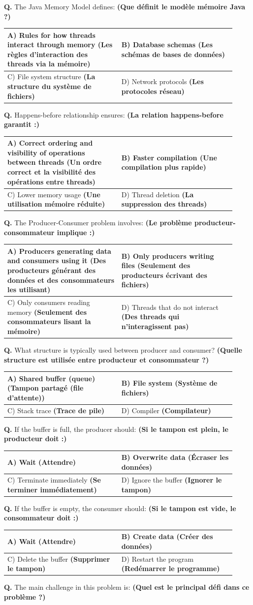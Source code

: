 \documentclass[11pt,a4paper]{article}
\newcounter{qnum}
\newcommand{\Q}{%
	\stepcounter{qnum}%
	\noindent\textbf{Q\theqnum. }%
}
\newcommand{\choices}[4]{%
	\setlength{\tabcolsep}{4pt}%
	\renewcommand{\arraystretch}{1.15}%
	\begin{tabular}{|p{0.46\linewidth}|p{0.46\linewidth}|}
		\hline
		A) #1 & B) #2 \\ \hline
		C) #3 & D) #4 \\ \hline
	\end{tabular}%
}
\begin{document}
\Q The Java Memory Model defines: \textbf{(Que définit le modèle mémoire Java ?) }

\choices
{Rules for how threads interact through memory \textbf{(Les règles d’interaction des threads via la mémoire)}}
{Database schemas \textbf{(Les schémas de bases de données)}}
{File system structure \textbf{(La structure du système de fichiers)}}
{Network protocols \textbf{(Les protocoles réseau)}}

\Q Happens-before relationship ensures: \textbf{(La relation happens-before garantit :) }

\choices
{Correct ordering and visibility of operations between threads \textbf{(Un ordre correct et la visibilité des opérations entre threads)}}
{Faster compilation \textbf{(Une compilation plus rapide)}}
{Lower memory usage \textbf{(Une utilisation mémoire réduite)}}
{Thread deletion \textbf{(La suppression des threads)}}

\Q The Producer-Consumer problem involves: \textbf{(Le problème producteur-consommateur implique :) }

\choices
{Producers generating data and consumers using it \textbf{(Des producteurs générant des données et des consommateurs les utilisant)}}
{Only producers writing files \textbf{(Seulement des producteurs écrivant des fichiers)}}
{Only consumers reading memory \textbf{(Seulement des consommateurs lisant la mémoire)}}
{Threads that do not interact \textbf{(Des threads qui n’interagissent pas)}}

\Q What structure is typically used between producer and consumer? \textbf{(Quelle structure est utilisée entre producteur et consommateur ?) }

\choices
{Shared buffer (queue) \textbf{(Tampon partagé (file d’attente))}}
{File system \textbf{(Système de fichiers)}}
{Stack trace \textbf{(Trace de pile)}}
{Compiler \textbf{(Compilateur)}}

\Q If the buffer is full, the producer should: \textbf{(Si le tampon est plein, le producteur doit :) }

\choices
{Wait \textbf{(Attendre)}}
{Overwrite data \textbf{(Écraser les données)}}
{Terminate immediately \textbf{(Se terminer immédiatement)}}
{Ignore the buffer \textbf{(Ignorer le tampon)}}

\Q If the buffer is empty, the consumer should: \textbf{(Si le tampon est vide, le consommateur doit :) }

\choices
{Wait \textbf{(Attendre)}}
{Create data \textbf{(Créer des données)}}
{Delete the buffer \textbf{(Supprimer le tampon)}}
{Restart the program \textbf{(Redémarrer le programme)}}
	\Q The main challenge in this problem is: \textbf{(Quel est le principal défi dans ce problème ?) }
	
\end{document}
